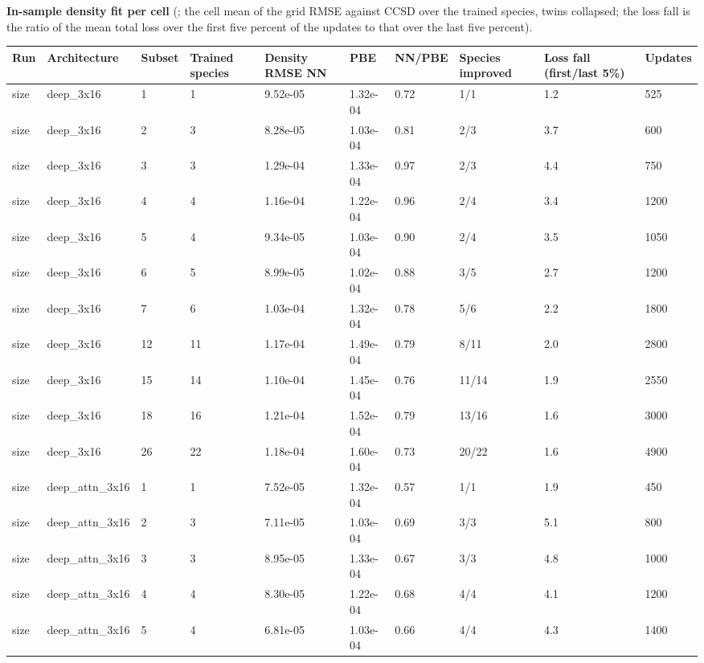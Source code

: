 \documentclass[10pt,a4paper]{article}
\begin{document}
\begin{landscape}
\textbf{In-sample density fit per cell} (; the cell mean of the grid RMSE against CCSD over the trained species, twins collapsed; the loss fall is the ratio of the mean total loss over the first five percent of the updates to that over the last five percent).

\begin{scriptsize}
\begin{longtable}{llllllllll}
\toprule Run & Architecture & Subset & Trained species & Density RMSE NN & PBE & NN/PBE & Species improved & Loss fall (first/last 5\%) & Updates \\ \midrule \endhead
size & deep\_3x16 & 1 & 1 & 9.52e-05 & 1.32e-04 & 0.72 & 1/1 & 1.2 & 525 \\
size & deep\_3x16 & 2 & 3 & 8.28e-05 & 1.03e-04 & 0.81 & 2/3 & 3.7 & 600 \\
size & deep\_3x16 & 3 & 3 & 1.29e-04 & 1.33e-04 & 0.97 & 2/3 & 4.4 & 750 \\
size & deep\_3x16 & 4 & 4 & 1.16e-04 & 1.22e-04 & 0.96 & 2/4 & 3.4 & 1200 \\
size & deep\_3x16 & 5 & 4 & 9.34e-05 & 1.03e-04 & 0.90 & 2/4 & 3.5 & 1050 \\
size & deep\_3x16 & 6 & 5 & 8.99e-05 & 1.02e-04 & 0.88 & 3/5 & 2.7 & 1200 \\
size & deep\_3x16 & 7 & 6 & 1.03e-04 & 1.32e-04 & 0.78 & 5/6 & 2.2 & 1800 \\
size & deep\_3x16 & 12 & 11 & 1.17e-04 & 1.49e-04 & 0.79 & 8/11 & 2.0 & 2800 \\
size & deep\_3x16 & 15 & 14 & 1.10e-04 & 1.45e-04 & 0.76 & 11/14 & 1.9 & 2550 \\
size & deep\_3x16 & 18 & 16 & 1.21e-04 & 1.52e-04 & 0.79 & 13/16 & 1.6 & 3000 \\
size & deep\_3x16 & 26 & 22 & 1.18e-04 & 1.60e-04 & 0.73 & 20/22 & 1.6 & 4900 \\
size & deep\_attn\_3x16 & 1 & 1 & 7.52e-05 & 1.32e-04 & 0.57 & 1/1 & 1.9 & 450 \\
size & deep\_attn\_3x16 & 2 & 3 & 7.11e-05 & 1.03e-04 & 0.69 & 3/3 & 5.1 & 800 \\
size & deep\_attn\_3x16 & 3 & 3 & 8.95e-05 & 1.33e-04 & 0.67 & 3/3 & 4.8 & 1000 \\
size & deep\_attn\_3x16 & 4 & 4 & 8.30e-05 & 1.22e-04 & 0.68 & 4/4 & 4.1 & 1200 \\
size & deep\_attn\_3x16 & 5 & 4 & 6.81e-05 & 1.03e-04 & 0.66 & 4/4 & 4.3 & 1400 \\

\end{longtable}
\end{scriptsize}
\end{landscape}
\end{document}
